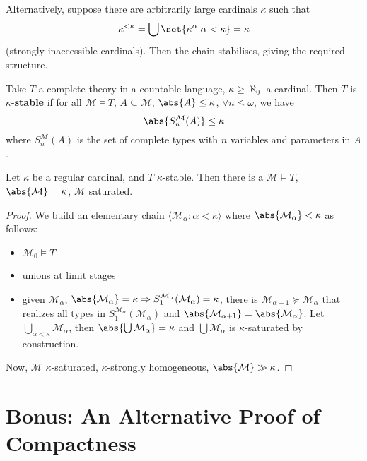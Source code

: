 \documentclass{article}
\makeatletter
\let\models\vDash
\newcommand{\bonusnamed}[1]{\textbf{#1}\index{#1@*#1}}
\newcommand{\M}{\mathcal{M}}
\makeatother
\begin{document}
Alternatively, suppose there are arbitrarily large cardinals $\kappa$ such that
\begin{align*}
  \kappa^{< \kappa} = \bigcup \set{\kappa^\alpha | \alpha < \kappa} = \kappa
\end{align*}
(strongly inaccessible cardinals).
Then the chain stabilises, giving the required structure. %
\begin{defi}
  Take $T$ a complete theory in a countable language, $\kappa \geq \aleph_0$ a cardinal.
  Then $T$ is $\kappa$-\bonusnamed{stable} if for all $\mathcal{M} \models T$, $A \subseteq \mathcal{M}$, $\abs{A} \leq \kappa$, $\forall n \leq \omega$,
  we have
  \begin{equation*}
    \abs{S_n^\mathcal{M}(A)} \leq \kappa
  \end{equation*}
  where $S_n^\mathcal{M}(A)$ is the set of complete types with $n$ variables and parameters in $A$.
\end{defi}
\begin{thm}
  Let $\kappa$ be a regular cardinal, and $T$ $\kappa$-stable. Then there is a $\mathcal{M} \models T$, $\abs{\mathcal{M}} = \kappa$, $\M$ saturated.
\end{thm}
\begin{proof}
  We build an elementary chain $\langle \M_\alpha : \alpha < \kappa \rangle$ where $\abs{\M_\alpha} < \kappa$ as follows:
  \begin{itemize}
    \item $\M_0 \models T$
    \item unions at limit stages
    \item given $\M_\alpha$, $\abs{\M_\alpha}=\kappa \Rightarrow S^{\M_\alpha}_1(\M_\alpha) = \kappa$,
      there is $\M_{\alpha+1} \succcurlyeq \M_\alpha$ that realizes all types in $S_1^{\M_\alpha}(\M_\alpha)$ and $\abs{\M_{\alpha+1}} = \abs{\M_\alpha}$.
      Let $\bigcup_{\alpha < \kappa} \M_\alpha$, then $\abs{\bigcup \M_\alpha} = \kappa$ and $\bigcup \M_\alpha$ is $\kappa$-saturated by construction.
  \end{itemize}
  Now, $\mathcal{M}$ $\kappa$-saturated, $\kappa$-strongly homogeneous, $\abs{\M} \gg \kappa$.
\end{proof}

\clearpage
\section{Bonus: An Alternative Proof of Compactness}
\label{sec:bonuscompact}
\end{document}
